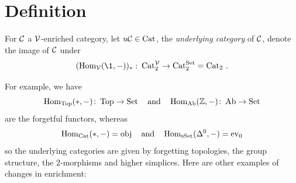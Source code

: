     \section{Definition}
        For $\mathcal{C}$ a $\mathcal{V}$-enriched category, let $u\mathcal{C} \in \operatorname{Cat}$, the \emph{underlying category} of $\mathcal{C}$, denote the image of $\mathcal{C}$ under
        \begin{equation*}
            (\Hom_{\Vv}(\1, -))_{*} \,\colon \Cat^{\Vv}_2 \to \Cat^{\Set}_2 = \Cat_2 \,.
        \end{equation*}
        \medskip

            For example, we have
        \begin{equation*}
            \operatorname{Hom}_{\operatorname{Top}}(*, -) \colon \operatorname{Top} \to \operatorname{Set} \quad \text{and} \quad \operatorname{Hom}_{\operatorname{Ab}}(\mathbb{Z}, -) \colon \operatorname{Ab} \to \operatorname{Set}
        \end{equation*}
        are the forgetful functors, whereas
        \begin{equation*}
            \operatorname{Hom}_{\operatorname{Cat}}(*, -) = \operatorname{obj} \quad \text{and} \quad \operatorname{Hom}_{\operatorname{sSet}}(\Delta^0, -) = \operatorname{ev}_0
        \end{equation*}
        so the underlying categories are given by forgetting topologies, the group structure, the $2$-morphisms and higher simplices. Here are other examples of changes in enrichment:

